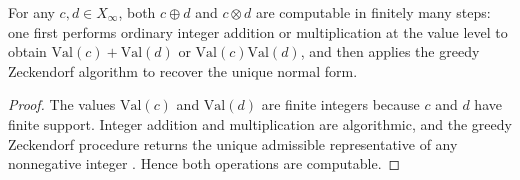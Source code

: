 \begin{proposition}\label{prop:zeckendorf-arith-computable}
For any \(c,d\in X_\infty\), both \(c\oplus d\) and \(c\otimes d\) are computable in finitely many steps: one first performs ordinary integer addition or multiplication at the value level to obtain \(\mathrm{Val}(c)+\mathrm{Val}(d)\) or \(\mathrm{Val}(c)\mathrm{Val}(d)\), and then applies the greedy Zeckendorf algorithm to recover the unique normal form.
\end{proposition}

\begin{proof}
The values \(\mathrm{Val}(c)\) and \(\mathrm{Val}(d)\) are finite integers because \(c\) and \(d\) have finite support. Integer addition and multiplication are algorithmic, and the greedy Zeckendorf procedure returns the unique admissible representative of any nonnegative integer \cite{Zeckendorf1972,Koshy2018}. Hence both operations are computable.
\end{proof}

